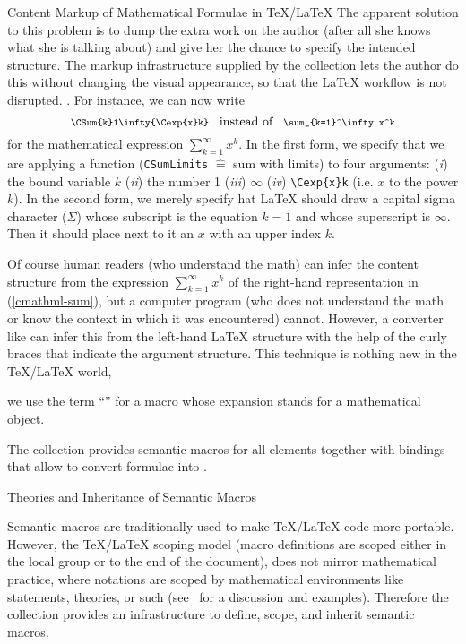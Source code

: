 \begin{omgroup}[id=stex,creators=miko]
\begin{module}[id=content-markup-LaTeX]
\begin{omgroup}{Content Markup of Mathematical Formulae in {\TeX/\LaTeX}}
  The apparent solution to this problem is to dump the extra work on the author (after all
  she knows what she is talking about) and give her the chance to specify the intended
  structure. The markup infrastructure supplied by the {\stex} collection lets the author
  do this without changing the visual appearance, so that the {\LaTeX} workflow is not
  disrupted. . For instance, we can now write
\begin{equation}\label{cmathml-sum}\footnotesize
  \verb|\CSum{k}1\infty{\Cexp{x}k}| \quad\hbox{\normalsize instead of}\quad
  \verb|\sum_{k=1}^\infty x^k|
\end{equation}
for the mathematical expression $\sum_{k=1}^\infty x^k$. In the first form, we specify
that we are applying a function (\verb|CSumLimits| $\hat=$ sum with limits) to four
arguments: ({\sl{i}}) the bound variable $k$ ({\sl{ii}}) the number 1 ({\sl{iii}})
$\infty$ ({\sl{iv}}) \verb|\Cexp{x}k| (i.e. $x$ to the power $k$).  In the second form, we
merely specify hat {\LaTeX} should draw a capital sigma character ($\Sigma$) whose
subscript is the equation $k=1$ and whose superscript is $\infty$. Then it should place
next to it an $x$ with an upper index $k$.

Of course human readers (who understand the math) can infer the content structure from the
expression $\sum_{k=1}^\infty x^k$ of the right-hand representation in
(\ref{cmathml-sum}), but a computer program (who does not understand the math or know the
context in which it was encountered) cannot. However, a converter like {\latexml} can
infer this from the left-hand {\LaTeX} structure with the help of the curly braces that
indicate the argument structure. This technique is nothing new in the {\TeX/\LaTeX} world,
\begin{definition}[display=flow]
  we use the term ``{}'' for a macro whose expansion stands for a
  mathematical object.
\end{definition}
The {\stex} collection provides semantic macros for all {\cmathml} elements together with
{\latexml} bindings that allow to convert {\stex} formulae into {\mathml}.
\end{omgroup}
\end{module}
\begin{omgroup}{Theories and Inheritance of Semantic Macros}

  Semantic macros are traditionally used to make {\TeX/\LaTeX} code more
  portable. However, the {\TeX/\LaTeX} scoping model (macro definitions are scoped either
  in the local group or to the end of the document), does not mirror mathematical
  practice, where notations are scoped by mathematical environments like statements,
  theories, or such (see~\cite{Kohlhase:smtl05} for a discussion and examples). Therefore
  the {\stex} collection provides an infrastructure to define, scope, and inherit semantic
  macros.


\end{omgroup}
\end{omgroup}
